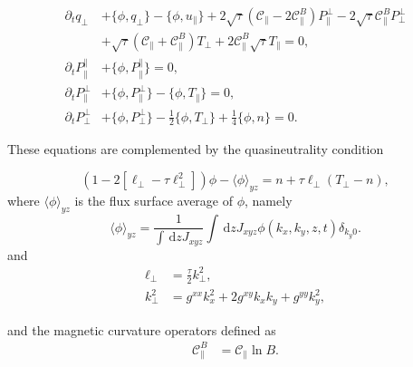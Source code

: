 \documentclass{article}
\newcommand{\dz}{\,\mathrm{d}z} %
\begin{document}
\begin{align}
\partial_t q_\perp &+ \{\phi, q_\perp\} - \{\phi, u_\parallel\} + 2\sqrt{\tau}(\mathcal{C}_\parallel - 2\mathcal{C}_\parallel^B)P_\parallel^\perp - 2\sqrt{\tau} \mathcal{C}_\parallel^B P_\perp^\perp \nonumber\\
&+ \sqrt{\tau}(\mathcal{C}_\parallel + \mathcal{C}_\parallel^B)T_\perp + 2 \mathcal{C}_\parallel^B\sqrt{\tau} T_\parallel = 0,\\
\partial_t P_\parallel^\parallel &+ \{\phi, P_\parallel^\parallel\} = 0, \\
\partial_t P_\parallel^\perp &+ \{\phi, P_\parallel^\perp\} - \{\phi, T_\parallel\} = 0, \\
\partial_t P_\perp^\perp &+ \{\phi, P_\perp^\perp\} - \frac{1}{2}\{\phi, T_\perp\} + \frac{1}{4}\{\phi, n\} = 0.
\end{align}

These equations are complemented by the quasineutrality condition

\begin{equation}
\left(1 - 2\left[\ell_\perp - \tau\ell_\perp^2\right]\right)\phi - \langle\phi\rangle_{yz} = n + \tau\ell_\perp(T_\perp - n),
\end{equation}
where $\langle \phi \rangle_{yz}$ is the flux surface average of $\phi$, namely
\begin{equation}
    \langle \phi \rangle_{yz} = \frac{1}{\int\dz J_{xyz}}\int\dz J_{xyz}\phi(k_x,k_y,z,t)\delta_{k_y0}.
\end{equation}
and
\begin{align}
\ell_\perp &= \frac{\tau}{2} k_\perp^2,\\
k_\perp^2 &= g^{xx}k_x^2 + 2g^{xy}k_x k_y + g^{yy}k_y^2,
\end{align}

and the magnetic curvature operators defined as
\begin{align}
\mathcal{C}_\parallel^{B} &= \mathcal{C}_\parallel\ln B.
\end{align}
\end{document}
